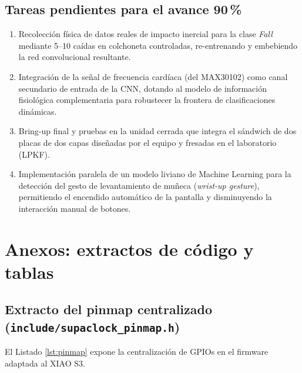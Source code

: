 \documentclass[letterpaper,11pt]{article}
\begin{document}
\subsection{Tareas pendientes para el avance 90\,\%}

\begin{enumerate}
    \item Recolección física de datos reales de impacto inercial para la clase \textit{Fall} mediante 5--10 caídas en colchoneta controladas, re-entrenando y embebiendo la red convolucional resultante.
    \item Integración de la señal de frecuencia cardíaca (del MAX30102) como canal secundario de entrada de la CNN, dotando al modelo de información fisiológica complementaria para robustecer la frontera de clasificaciones dinámicas.
    \item Bring-up final y pruebas en la unidad cerrada que integra el sándwich de dos placas de dos capas diseñadas por el equipo y fresadas en el laboratorio (LPKF).
    \item Implementación paralela de un modelo liviano de Machine Learning para la detección del gesto de levantamiento de muñeca (\textit{wrist-up gesture}), permitiendo el encendido automático de la pantalla y disminuyendo la interacción manual de botones.
\end{enumerate}

\newpage




\newpage

\appendix
\section{Anexos: extractos de código y tablas}

\subsection{Extracto del pinmap centralizado (\texttt{include/supaclock\_pinmap.h})}\label{sec:anexo_pinmap}

El Listado \ref{lst:pinmap} expone la centralización de GPIOs en el firmware adaptada al XIAO S3.
\end{document}
